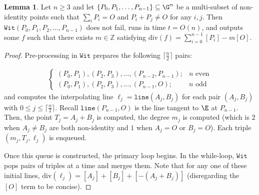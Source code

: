 \documentclass[11pt,letterpaper]{article}
\theoremstyle{definition}
\newtheorem{lemm}[theorem]{Lemma}
\newcommand{\6}{\mathbf}
\newcommand{\7}{\mathcal}
\begin{document}
\begin{lemm}
\label{lem:witnessCorrectness}
Let $n \geq 3$ and let $\left\{P_0, P_1, \ldots, P_{n-1}\right\} \subseteq \G^n$ be a multi-subset of non-identity points such that $\sum_i P_i = O$ and $P_i + P_j \neq O$ for any $i,j$. Then $\texttt{Wit}(P_0, P_1, P_2, \ldots, P_{n-1})$ does not fail, runs in time $t = O(n)$, and outputs some $f$ such that there exists $m \in \mathbb{Z}$ satisfying $\text{div}(f) = \sum_{i=0}^{n-1} [P_i] - m[O]$. 
\end{lemm}
\begin{proof}
Pre-processing in $\texttt{Wit}$ prepares the following $\lceil \frac{n}{2}\rceil$ pairs:

\begin{align*}
\begin{cases}
(P_0, P_1), (P_2, P_3), \ldots, (P_{n-2}, P_{n-1});& n \text{ even} \\
 (P_0, P_1), (P_2, P_3), \ldots, (P_{n-1}, O);& n \text{ odd} 
 \end{cases}
\end{align*}
and computes the interpolating line $\ell_j = \texttt{line}(A_j,B_j)$ for each pair $(A_j, B_j)$ with $0 \leq j \leq \lceil \frac{n}{2}\rceil$. Recall $\texttt{line}(P_{n-1},O)$ is the line tangent to $\E$ at $P_{n-1}$. 
Then, the point $T_j = A_j + B_j$ is computed, the degree $m_j$ is computed (which is $2$ when $A_j \neq B_j$ are both non-identity and $1$ when $A_j = O$ or $B_j = O$). Each triple $(m_j, T_j, \ell_j)$ is enqueued. 

Once this queue is constructed, the primary loop begins.
In the while-loop, $\texttt{Wit}$ pops pairs of triples at a time and merges them.  Note that for any one of these initial lines, $\text{div}(\ell_j) = [A_j] + [B_j] + [-(A_j+B_j)]$ (disregarding the $[O]$ term to be concise). 


\end{proof}
\end{document}
